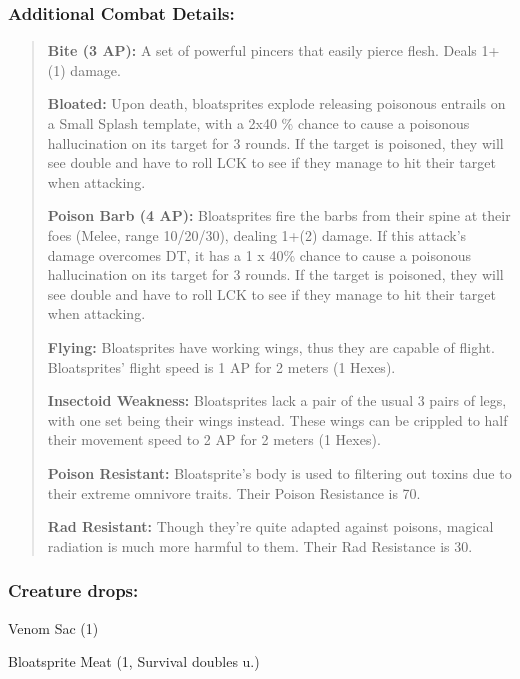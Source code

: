 \documentclass[11pt,a4paper,twocolumn]{book}
\begin{document}
	\subsubsection*{Additional Combat Details:}
	\begin{verse}
		\textbf{Bite (3 AP):} A set of powerful pincers that easily pierce flesh. Deals 1+(1) damage. 
		
		\textbf{Bloated:} Upon death, bloatsprites explode releasing poisonous entrails on a Small Splash template, with a 2x40 \%  chance to cause a poisonous hallucination on its target for 3 rounds. If the target is poisoned, they will see double and have to roll LCK to see if they manage to hit their target when attacking.
		
		\textbf{Poison Barb (4 AP):} Bloatsprites fire the barbs from their spine at their foes (Melee, range 10/20/30), dealing 1+(2) damage. If this attack's damage overcomes DT, it has a 1 x 40\% chance to cause a poisonous hallucination on its target for 3 rounds. If the target is poisoned, they will see double and have to roll LCK to see if they manage to hit their target when attacking.
		
		\textbf{Flying:} Bloatsprites have working wings, thus they are capable of flight. Bloatsprites' flight speed is 1 AP for 2 meters (1 Hexes).
		
		\textbf{Insectoid Weakness:} Bloatsprites lack a pair of the usual 3 pairs of legs, with one set being their wings instead. These wings can be crippled to half their movement speed to 2 AP for 2 meters (1 Hexes).
		
		\textbf{Poison Resistant:} Bloatsprite's body is used to filtering out toxins due to their extreme omnivore traits. Their Poison Resistance is 70.
		
		\textbf{Rad Resistant:} Though they're quite adapted against poisons, magical radiation is much more harmful to them. Their Rad Resistance is 30.
	\end{verse}
	
	\subsubsection*{Creature drops:}
	\begin{compactitem}
		\item Venom Sac (1)
		\item Bloatsprite Meat (1, Survival doubles u.)
	\end{compactitem}
	
\end{document}
